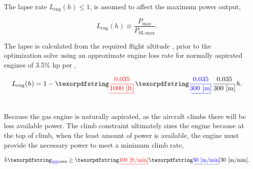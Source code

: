 \DIFdelbegin \subsubsection{}
\addtocounter{subsubsection}{-1}%

\DIFdelend The lapse rate $L_{\text{eng}}(h) \leq 1$, is assumed to affect the maximum power output,

\begin{equation}
    \label{e:lapse}
    L_{\text{eng}}(h) \equiv \frac{P_{\text{max}}}{P_{\text{SL-max}}}.
\end{equation}

The lapse is calculated from the required flight altitude \DIFdelbegin {}\DIFdelend \DIFaddbegin {}, prior to the optimization solve using an approximate engine loss rate for normally aspirated engines of 3.5\% hp per \DIFdelbegin {}\DIFdelend \DIFaddbegin {}\DIFaddend ,\cite{enginelapse}

\begin{equation}
    \label{e:lapsefit}
    L_{\text{eng}}(h) = 1 - \DIFdelbegin \DIFdel{\frac{0.035}{1000 \text{ [ft]}} }\DIFdelend \DIFaddbegin \DIFadd{\frac{0.035}{300 \text{ [m]}} }\DIFaddend h.
\end{equation}

\DIFdelbegin \subsection{}
\addtocounter{subsection}{-1}%
\DIFdelend \DIFaddbegin \subsubsection{}
\DIFaddend 

Because the gas engine is naturally aspirated, as the aircraft climbs there will be less available power.  
The climb constraint ultimately sizes the engine because at the top of climb, when the least amount of power is available, the engine must provide the necessary power to meet a minimum climb rate, 

\begin{equation}
    \label{e:climbrate}
    \dot{h}\DIFaddbegin \DIFadd{_{\text{min}} }\DIFaddend \geq \DIFdelbegin \DIFdel{100 \text{ [ft/min]}}\DIFdelend \DIFaddbegin \DIFadd{30 \text{ [m/min]}}\DIFaddend .
\end{equation}

